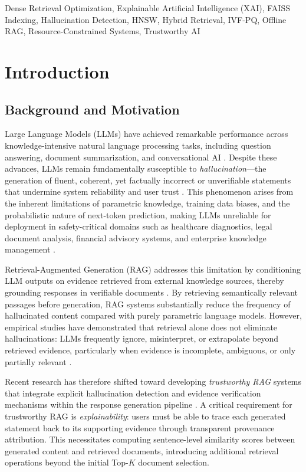 \documentclass[conference]{IEEEtran}
\begin{document}
\begin{IEEEkeywords}
Dense Retrieval Optimization, Explainable Artificial Intelligence (XAI), FAISS Indexing, Hallucination Detection, HNSW, Hybrid Retrieval, IVF-PQ, Offline RAG, Resource-Constrained Systems, Trustworthy AI
\end{IEEEkeywords}

\section{Introduction}

\subsection{Background and Motivation}

Large Language Models (LLMs) have achieved remarkable performance across knowledge-intensive natural language processing tasks, including question answering, document summarization, and conversational AI \cite{brown2020gpt3,touvron2023llama}. Despite these advances, LLMs remain fundamentally susceptible to \emph{hallucination}—the generation of fluent, coherent, yet factually incorrect or unverifiable statements that undermine system reliability and user trust \cite{ji2023survey,huang2025survey}. This phenomenon arises from the inherent limitations of parametric knowledge, training data biases, and the probabilistic nature of next-token prediction, making LLMs unreliable for deployment in safety-critical domains such as healthcare diagnostics, legal document analysis, financial advisory systems, and enterprise knowledge management \cite{pal2023medical,islam2023financebench}.

Retrieval-Augmented Generation (RAG) addresses this limitation by conditioning LLM outputs on evidence retrieved from external knowledge sources, thereby grounding responses in verifiable documents \cite{lewis2020rag,guu2020realm,izacard2022atlas}. By retrieving semantically relevant passages before generation, RAG systems substantially reduce the frequency of hallucinated content compared with purely parametric language models. However, empirical studies have demonstrated that retrieval alone does not eliminate hallucinations: LLMs frequently ignore, misinterpret, or extrapolate beyond retrieved evidence, particularly when evidence is incomplete, ambiguous, or only partially relevant \cite{chen2024benchmarking,niu2024ragtruth,mallen2023trust}.

Recent research has therefore shifted toward developing \emph{trustworthy RAG} systems that integrate explicit hallucination detection and evidence verification mechanisms within the response generation pipeline \cite{zhang2024feel,es2024ragas,manakul2023selfcheckgpt}. A critical requirement for trustworthy RAG is \emph{explainability}: users must be able to trace each generated statement back to its supporting evidence through transparent provenance attribution. This necessitates computing sentence-level similarity scores between generated content and retrieved documents, introducing additional retrieval operations beyond the initial Top-$K$ document selection.
\end{document}
